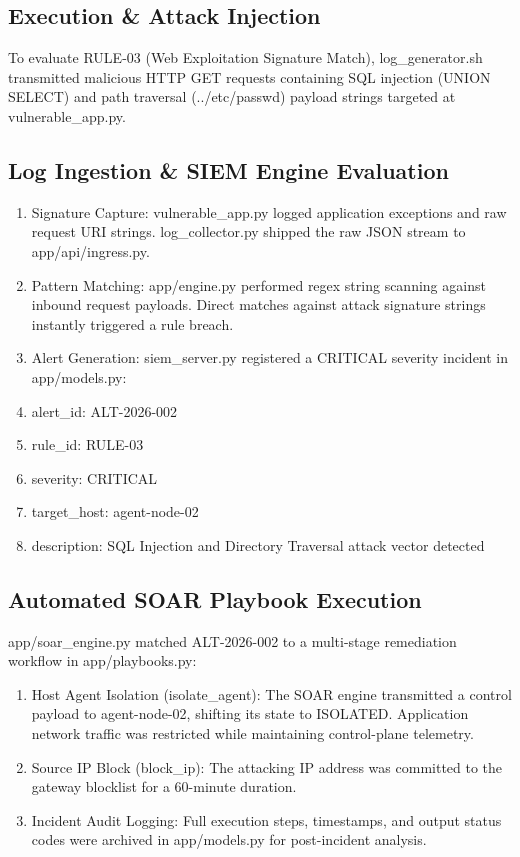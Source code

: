 \subsection{Execution \& Attack Injection}

To evaluate RULE-03 (Web Exploitation Signature Match), log\_generator.sh transmitted malicious HTTP GET requests containing SQL injection (UNION SELECT) and path traversal (../etc/passwd) payload strings targeted at vulnerable\_app.py.

\subsection{Log Ingestion \& SIEM Engine Evaluation}

\begin{enumerate}
  \item Signature Capture: vulnerable\_app.py logged application exceptions and raw request URI strings. log\_collector.py shipped the raw JSON stream to app/api/ingress.py.
  \item Pattern Matching: app/engine.py performed regex string scanning against inbound request payloads. Direct matches against attack signature strings instantly triggered a rule breach.
  \item Alert Generation: siem\_server.py registered a CRITICAL severity incident in app/models.py:
  \item alert\_id: ALT-2026-002
  \item rule\_id: RULE-03
  \item severity: CRITICAL
  \item target\_host: agent-node-02
  \item description: SQL Injection and Directory Traversal attack vector detected
\end{enumerate}

\subsection{Automated SOAR Playbook Execution}

app/soar\_engine.py matched ALT-2026-002 to a multi-stage remediation workflow in app/playbooks.py:

\begin{enumerate}
  \item Host Agent Isolation (isolate\_agent): The SOAR engine transmitted a control payload to agent-node-02, shifting its state to ISOLATED. Application network traffic was restricted while maintaining control-plane telemetry.
  \item Source IP Block (block\_ip): The attacking IP address was committed to the gateway blocklist for a 60-minute duration.
  \item Incident Audit Logging: Full execution steps, timestamps, and output status codes were archived in app/models.py for post-incident analysis.
\end{enumerate}

